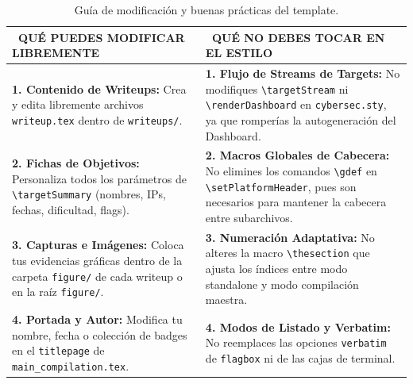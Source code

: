 \documentclass[../../main_compilation.tex]{subfiles}
\begin{document}
\begin{table}[h!]
	\centering
	\small
	\begin{tabularx}{\textwidth}{p{7.5cm} p{7.5cm}}
		\toprule
		\cellcolor{csecGreen}\textbf{\color{white}\faCheckCircle\ QUÉ PUEDES MODIFICAR LIBREMENTE}                                                            &
		\cellcolor{sevCritical}\textbf{\color{white}\faTimesCircle\ QUÉ NO DEBES TOCAR EN EL ESTILO} \tabularnewline
		\midrule
		\textbf{1. Contenido de Writeups:} Crea y edita libremente archivos \texttt{writeup.tex} dentro de \texttt{writeups/}.                                &
		\textbf{1. Flujo de Streams de Targets:} No modifiques \texttt{\textbackslash targetStream} ni \texttt{\textbackslash renderDashboard} en \texttt{cybersec.sty}, ya que romperías la autogeneración del Dashboard. \tabularnewline
		\midrule
		\textbf{2. Fichas de Objetivos:} Personaliza todos los parámetros de \texttt{\textbackslash targetSummary} (nombres, IPs, fechas, dificultad, flags). &
		\textbf{2. Macros Globales de Cabecera:} No elimines los comandos \texttt{\textbackslash gdef} en \texttt{\textbackslash setPlatformHeader}, pues son necesarios para mantener la cabecera entre subarchivos. \tabularnewline
		\midrule
		\textbf{3. Capturas e Imágenes:} Coloca tus evidencias gráficas dentro de la carpeta \texttt{figure/} de cada writeup o en la raíz \texttt{figure/}.  &
		\textbf{3. Numeración Adaptativa:} No alteres la macro \texttt{\textbackslash thesection} que ajusta los índices entre modo standalone y modo compilación maestra. \tabularnewline
		\midrule
		\textbf{4. Portada y Autor:} Modifica tu nombre, fecha o colección de badges en el \texttt{titlepage} de \texttt{main\_compilation.tex}.              &
		\textbf{4. Modos de Listado y Verbatim:} No reemplaces las opciones \texttt{verbatim} de \texttt{flagbox} ni de las cajas de terminal. \tabularnewline
		\bottomrule
	\end{tabularx}
	\caption{Guía de modificación y buenas prácticas del template.}
\end{table}
\end{document}
